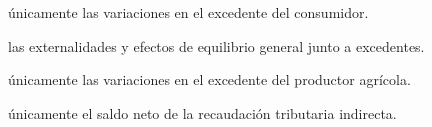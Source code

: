 \begin{opts}
    \item únicamente las variaciones en el excedente del consumidor.
    \item las externalidades y efectos de equilibrio general junto a excedentes.
    \item únicamente las variaciones en el excedente del productor agrícola.
    \item únicamente el saldo neto de la recaudación tributaria indirecta.
\end{opts}
